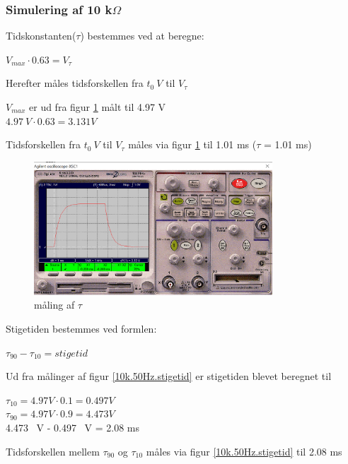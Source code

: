 \subsubsection{Simulering af 10 k$\Omega$ }
Tidskonstanten($\tau$) bestemmes ved at beregne:

\begin{center}
$V_{max} \cdot 0.63 = V_{\tau}$
\end{center}

Herefter måles tidsforskellen fra $t_0 \  V$ til $V_{\tau}$

$V_{max}$ er ud fra figur \ref{10k.50Hz.tau} målt til 4.97 V
\\ 
$4.97 \ V \cdot 0.63 = 3.131 V$

Tidsforskellen fra $t_0 \ V$ til $V_{\tau}$ måles via figur \ref{10k.50Hz.tau} til 1.01 ms ($\tau$ = 1.01 ms)


\begin{figure}[h]
 \begin{center}
  \includegraphics[height=5cm]{P_Fig/figur3_10k_50Hz_tau.png}
  \caption{måling af $\tau$}
  \label{10k.50Hz.tau}
 \end{center}
\end{figure}

\newpage

Stigetiden bestemmes ved formlen:
\begin{center}
$\tau_{90} - \tau_{10} = stigetid$
\end{center}

Ud fra målinger af figur \ref{10k.50Hz.stigetid}
er stigetiden blevet beregnet til

\begin{center}
$\tau_{10} = 4.97 V \cdot 0.1 = 0.497 V$
\\
$\tau_{90} = 4.97 V \cdot 0.9 = 4.473 V$
\\ 
4.473 \ V - 0.497 \ V = 2.08 ms
\end{center}

Tidsforskellen mellem $\tau_{90}$ og $\tau_{10}$ måles via figur \ref{10k.50Hz.stigetid} til 2.08 ms

